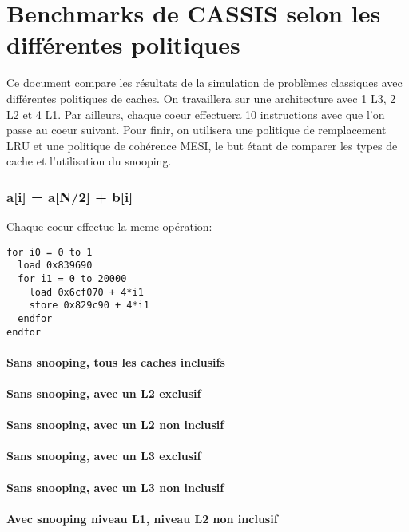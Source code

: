 \documentclass{article}
\begin{document}
\part*{Benchmarks de CASSIS selon les différentes politiques}
\indent Ce document compare les résultats de la simulation de problèmes classiques avec différentes politiques de caches. On travaillera sur une architecture avec 1 L3, 2 L2 et 4 L1. Par ailleurs, chaque coeur effectuera 10 instructions avec que l'on passe au coeur suivant. Pour finir, on utilisera une politique de remplacement LRU et une politique de cohérence MESI, le but étant de comparer les types de cache et l'utilisation du snooping.

\section{a[i] = a[N/2] + b[i]}
\indent Chaque coeur effectue la meme opération:
\begin{verbatim}
for i0 = 0 to 1
  load 0x839690
  for i1 = 0 to 20000
    load 0x6cf070 + 4*i1
    store 0x829c90 + 4*i1
  endfor
endfor
\end{verbatim}

\subsection*{Sans snooping, tous les caches inclusifs}

\subsection*{Sans snooping, avec un L2 exclusif}

\subsection*{Sans snooping, avec un L2 non inclusif}

\subsection*{Sans snooping, avec un L3 exclusif}

\subsection*{Sans snooping, avec un L3 non inclusif}

\subsection*{Avec snooping niveau L1, niveau L2 non inclusif}
\end{document}
